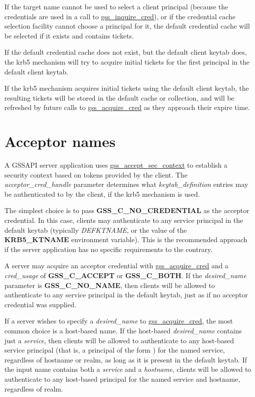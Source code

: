 \documentclass[letterpaper,10pt,english]{sphinxmanual}
\begin{document}
If the target name cannot be used to select a client principal
(because the credentials are used in a call to \href{http://tools.ietf.org/html/rfc2744.html\#section-5.21}{gss\_inquire\_cred}), or
if the credential cache selection facility cannot choose a principal
for it, the default credential cache will be selected if it exists and
contains tickets.

If the default credential cache does not exist, but the default client
keytab does, the krb5 mechanism will try to acquire initial tickets
for the first principal in the default client keytab.

If the krb5 mechanism acquires initial tickets using the default
client keytab, the resulting tickets will be stored in the default
cache or collection, and will be refreshed by future calls to
\href{http://tools.ietf.org/html/rfc2744.html\#section-5.2}{gss\_acquire\_cred} as they approach their expire time.


\section{Acceptor names}
\label{appdev/gssapi:acceptor-names}
A GSSAPI server application uses \href{http://tools.ietf.org/html/rfc2744.html\#section-5.1}{gss\_accept\_sec\_context} to establish
a security context based on tokens provided by the client.  The
\emph{acceptor\_cred\_handle} parameter determines what
\emph{keytab\_definition} entries may be authenticated to by the
client, if the krb5 mechanism is used.

The simplest choice is to pass \textbf{GSS\_C\_NO\_CREDENTIAL} as the acceptor
credential.  In this case, clients may authenticate to any service
principal in the default keytab (typically \emph{DEFKTNAME}, or the value of
the \textbf{KRB5\_KTNAME} environment variable).  This is the recommended
approach if the server application has no specific requirements to the
contrary.

A server may acquire an acceptor credential with \href{http://tools.ietf.org/html/rfc2744.html\#section-5.2}{gss\_acquire\_cred} and
a \emph{cred\_usage} of \textbf{GSS\_C\_ACCEPT} or \textbf{GSS\_C\_BOTH}.  If the
\emph{desired\_name} parameter is \textbf{GSS\_C\_NO\_NAME}, then clients will be
allowed to authenticate to any service principal in the default
keytab, just as if no acceptor credential was supplied.

If a server wishes to specify a \emph{desired\_name} to \href{http://tools.ietf.org/html/rfc2744.html\#section-5.2}{gss\_acquire\_cred},
the most common choice is a host-based name.  If the host-based
\emph{desired\_name} contains just a \emph{service}, then clients will be allowed
to authenticate to any host-based service principal (that is, a
principal of the form ) for the named
service, regardless of hostname or realm, as long as it is present in
the default keytab.  If the input name contains both a \emph{service} and a
\emph{hostname}, clients will be allowed to authenticate to any host-based
principal for the named service and hostname, regardless of realm.
\end{document}
